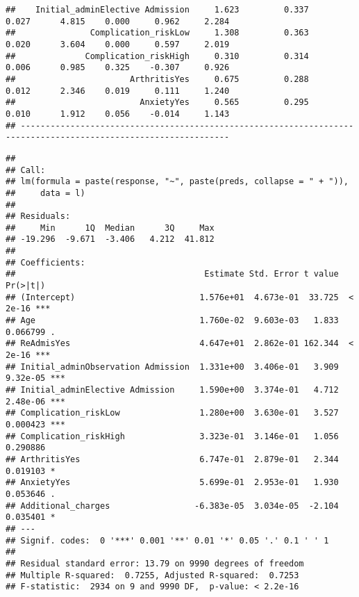 \documentclass[
]{article}
\newenvironment{Shaded}{\begin{snugshade}}{\end{snugshade}}
\newcommand{\CommentTok}[1]{\textcolor[rgb]{0.56,0.35,0.01}{\textit{#1}}}
\newcommand{\FunctionTok}[1]{\textcolor[rgb]{0.00,0.00,0.00}{#1}}
\newcommand{\NormalTok}[1]{#1}
\newcommand{\SpecialCharTok}[1]{\textcolor[rgb]{0.00,0.00,0.00}{#1}}
\begin{document}
\begin{verbatim}
##    Initial_adminElective Admission     1.623         0.337        0.027      4.815    0.000     0.962     2.284 
##               Complication_riskLow     1.308         0.363        0.020      3.604    0.000     0.597     2.019 
##              Complication_riskHigh     0.310         0.314        0.006      0.985    0.325    -0.307     0.926 
##                       ArthritisYes     0.675         0.288        0.012      2.346    0.019     0.111     1.240 
##                         AnxietyYes     0.565         0.295        0.010      1.912    0.056    -0.014     1.143 
## ----------------------------------------------------------------------------------------------------------------
\end{verbatim}

\begin{Shaded}
\end{Shaded}

\begin{verbatim}
## 
## Call:
## lm(formula = paste(response, "~", paste(preds, collapse = " + ")), 
##     data = l)
## 
## Residuals:
##     Min      1Q  Median      3Q     Max 
## -19.296  -9.671  -3.406   4.212  41.812 
## 
## Coefficients:
##                                      Estimate Std. Error t value Pr(>|t|)    
## (Intercept)                         1.576e+01  4.673e-01  33.725  < 2e-16 ***
## Age                                 1.760e-02  9.603e-03   1.833 0.066799 .  
## ReAdmisYes                          4.647e+01  2.862e-01 162.344  < 2e-16 ***
## Initial_adminObservation Admission  1.331e+00  3.406e-01   3.909 9.32e-05 ***
## Initial_adminElective Admission     1.590e+00  3.374e-01   4.712 2.48e-06 ***
## Complication_riskLow                1.280e+00  3.630e-01   3.527 0.000423 ***
## Complication_riskHigh               3.323e-01  3.146e-01   1.056 0.290886    
## ArthritisYes                        6.747e-01  2.879e-01   2.344 0.019103 *  
## AnxietyYes                          5.699e-01  2.953e-01   1.930 0.053646 .  
## Additional_charges                 -6.383e-05  3.034e-05  -2.104 0.035401 *  
## ---
## Signif. codes:  0 '***' 0.001 '**' 0.01 '*' 0.05 '.' 0.1 ' ' 1
## 
## Residual standard error: 13.79 on 9990 degrees of freedom
## Multiple R-squared:  0.7255, Adjusted R-squared:  0.7253 
## F-statistic:  2934 on 9 and 9990 DF,  p-value: < 2.2e-16
\end{verbatim}
\end{document}
